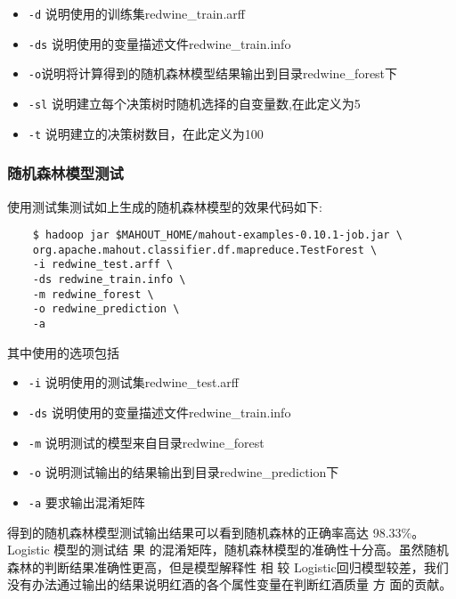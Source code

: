 \begin{itemize}
\item
  \lstinline!-d! 说明使用的训练集redwine\_train.arff
\item
  \lstinline!-ds! 说明使用的变量描述文件redwine\_train.info
\item
  \lstinline!-o!说明将计算得到的随机森林模型结果输出到目录redwine\_forest下
\item
  \lstinline!-sl! 说明建立每个决策树时随机选择的自变量数,在此定义为5
\item
  \lstinline!-t! 说明建立的决策树数目，在此定义为100
\end{itemize}

\subsubsection{随机森林模型测试}\label{ux968fux673aux68eeux6797ux6a21ux578bux6d4bux8bd5}

使用测试集测试如上生成的随机森林模型的效果代码如下:

\begin{lstlisting}
	$ hadoop jar $MAHOUT_HOME/mahout-examples-0.10.1-job.jar \
	org.apache.mahout.classifier.df.mapreduce.TestForest \
	-i redwine_test.arff \
	-ds redwine_train.info \
	-m redwine_forest \
	-o redwine_prediction \
	-a
\end{lstlisting}

其中使用的选项包括

\begin{itemize}
\item
  \lstinline!-i! 说明使用的测试集redwine\_test.arff
\item
  \lstinline!-ds! 说明使用的变量描述文件redwine\_train.info
\item
  \lstinline!-m! 说明测试的模型来自目录redwine\_forest
\item
  \lstinline!-o! 说明测试输出的结果输出到目录redwine\_prediction下
\item
  \lstinline!-a! 要求输出混淆矩阵
\end{itemize}

得到的随机森林模型测试输出结果可以看到随机森林的正确率高达 98.33\%。Logistic 模型的测试结
果 的混淆矩阵，随机森林模型的准确性十分高。虽然随机森林的判断结果准确性更高，但是模型解释性
相 较 Logistic回归模型较差，我们没有办法通过输出的结果说明红酒的各个属性变量在判断红酒质量
方 面的贡献。
